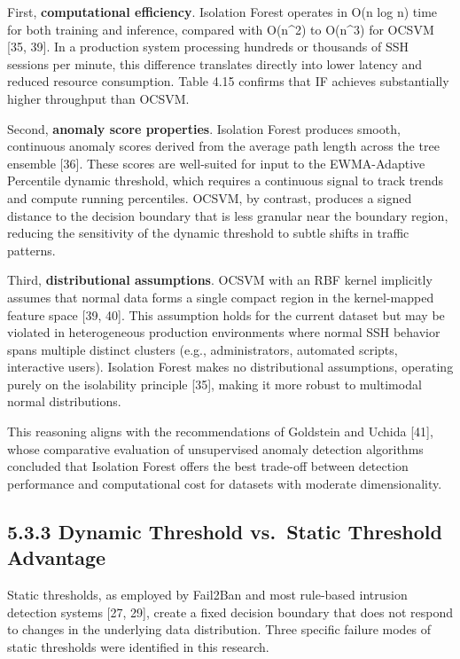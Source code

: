 \documentclass[
  a4paper]{report}
\begin{document}
First, \textbf{computational efficiency}. Isolation Forest operates in
O(n log n) time for both training and inference, compared with O(n\^{}2)
to O(n\^{}3) for OCSVM {[}35, 39{]}. In a production system processing
hundreds or thousands of SSH sessions per minute, this difference
translates directly into lower latency and reduced resource consumption.
Table 4.15 confirms that IF achieves substantially higher throughput
than OCSVM.

Second, \textbf{anomaly score properties}. Isolation Forest produces
smooth, continuous anomaly scores derived from the average path length
across the tree ensemble {[}36{]}. These scores are well-suited for
input to the EWMA-Adaptive Percentile dynamic threshold, which requires
a continuous signal to track trends and compute running percentiles.
OCSVM, by contrast, produces a signed distance to the decision boundary
that is less granular near the boundary region, reducing the sensitivity
of the dynamic threshold to subtle shifts in traffic patterns.

Third, \textbf{distributional assumptions}. OCSVM with an RBF kernel
implicitly assumes that normal data forms a single compact region in the
kernel-mapped feature space {[}39, 40{]}. This assumption holds for the
current dataset but may be violated in heterogeneous production
environments where normal SSH behavior spans multiple distinct clusters
(e.g., administrators, automated scripts, interactive users). Isolation
Forest makes no distributional assumptions, operating purely on the
isolability principle {[}35{]}, making it more robust to multimodal
normal distributions.

This reasoning aligns with the recommendations of Goldstein and Uchida
{[}41{]}, whose comparative evaluation of unsupervised anomaly detection
algorithms concluded that Isolation Forest offers the best trade-off
between detection performance and computational cost for datasets with
moderate dimensionality.

\subsection{5.3.3 Dynamic Threshold vs.~Static Threshold
Advantage}\label{dynamic-threshold-vs.-static-threshold-advantage}

Static thresholds, as employed by Fail2Ban and most rule-based intrusion
detection systems {[}27, 29{]}, create a fixed decision boundary that
does not respond to changes in the underlying data distribution. Three
specific failure modes of static thresholds were identified in this
research.
\end{document}
